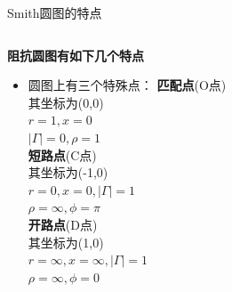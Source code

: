 \begin{frame}{Smith圆图的特点}
  \begin{columns}
    \begin{column}{0.4\linewidth}
      \textbf{阻抗圆图有如下几个特点}
      \begin{itemize}
        \item 圆图上有三个特殊点：
              \footnotesize{\textbf{匹配点}(O点)\\
                其坐标为(0,0)\\
                $r=1,x=0$ \\
                $\lvert\Gamma\rvert=0,\rho=1$\\
                \textbf{短路点}(C点)\\
                其坐标为(-1,0)\\
                $r=0,x=0,\lvert\Gamma\rvert=1$ \\
                $\rho=\infty,\phi=\pi$ \\
                \textbf{开路点}(D点)\\
                其坐标为(1,0)\\
                $r=\infty,x=\infty,\lvert\Gamma\rvert=1$ \\
                $\rho=\infty,\phi=0$}
      \end{itemize}


\end{column}
\end{columns}
\end{frame}
